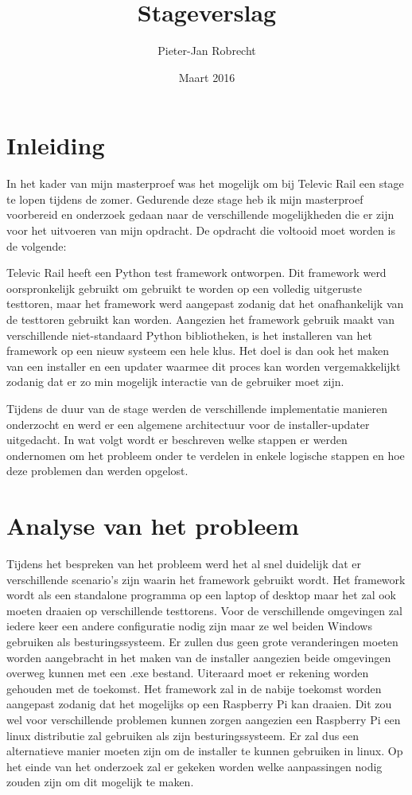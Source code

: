 \documentclass{article}
\title{Stageverslag}
\author{\mbox{Pieter-Jan} Robrecht}
\date{Maart 2016}
\begin{document}


\clearpage
\setcounter{page}{1}
\tableofcontents
\clearpage

\section{Inleiding}
In het kader van mijn masterproef was het mogelijk om bij Televic Rail een stage te lopen tijdens de zomer. 
Gedurende deze stage heb ik mijn masterproef voorbereid en onderzoek gedaan naar de verschillende mogelijkheden die er zijn voor het uitvoeren van mijn opdracht.
De opdracht die voltooid moet worden is de volgende:
\begin{displayquote}
Televic Rail heeft een Python test framework ontworpen. 
Dit framework werd oorspronkelijk gebruikt om gebruikt te worden op een volledig uitgeruste testtoren, maar het framework werd aangepast zodanig dat het onafhankelijk van de testtoren gebruikt kan worden.
Aangezien het framework gebruik maakt van verschillende niet-standaard Python bibliotheken, is het installeren van het framework op een nieuw systeem een hele klus.
Het doel is dan ook het maken van een installer en een updater waarmee dit proces kan worden vergemakkelijkt zodanig dat er zo min mogelijk interactie van de gebruiker moet zijn.
\end{displayquote}
Tijdens de duur van de stage werden de verschillende implementatie manieren onderzocht en werd er een algemene architectuur voor de installer-updater uitgedacht.
In wat volgt wordt er beschreven welke stappen er werden ondernomen om het probleem onder te verdelen in enkele logische stappen en hoe deze problemen dan werden opgelost. 

\section{Analyse van het probleem}
Tijdens het bespreken van het probleem werd het al snel duidelijk dat er verschillende scenario's zijn waarin het framework gebruikt wordt. Het framework wordt als een standalone programma op een laptop of desktop maar het zal ook moeten draaien op verschillende testtorens. 
Voor de verschillende omgevingen zal iedere keer een andere configuratie nodig zijn maar ze wel beiden Windows gebruiken als besturingssysteem. 
Er zullen dus geen grote veranderingen moeten worden aangebracht in het maken van de installer aangezien beide omgevingen overweg kunnen met een .exe bestand. 
Uiteraard moet er rekening worden gehouden met de toekomst. 
Het framework zal in de nabije toekomst worden aangepast zodanig dat het mogelijks op een Raspberry Pi kan draaien.
Dit zou wel voor verschillende problemen kunnen zorgen aangezien een Raspberry Pi een linux distributie zal gebruiken als zijn besturingssysteem.
Er zal dus een alternatieve manier moeten zijn om de installer te kunnen gebruiken in linux.
Op het einde van het onderzoek zal er gekeken worden welke aanpassingen nodig zouden zijn om dit mogelijk te maken.
\end{document}
